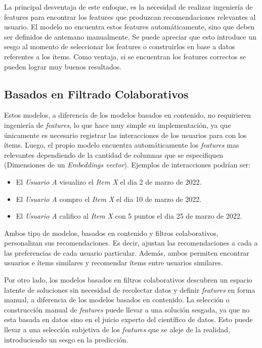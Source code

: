 \documentclass[11pt,a4paper,twoside]{thesis}
\begin{document}
La principal desventaja de este enfoque, es la necesidad de realizar ingeniería
de features para encontrar los features que produzcan recomendaciones
relevantes al usuario. El modelo no encuentra estos features automáticamente,
sino que deben ser definidos de antemano manualmente. Se puede apreciar que
esto introduce un sesgo al momento de seleccionar los features o construirlos
en base a datos referentes a los ítems. Como ventaja, si se encuentran los
features correctos se pueden lograr muy buenos resultados.

\subsection{Basados en Filtrado Colaborativos}

Estos modelos, a diferencia de los modelos basados en contenido, no requirieren
ingeniería de \textit{features}, lo que hace muy simple su implementación, ya
que únicamente es necesario registrar las interacciones de los usuarios para
con los ítems. Luego, el propio modelo encuentra automáticamente los
\textit{features} mas relevantes dependiendo de la cantidad de columnas que se
especifiquen (Dimensiones de un \textit{Embeddings vector}). Ejemplos de
interacciones podrían ser:

\begin{itemize}
	\item El \textit{Usuario A} visualizo el \textit{Item X} el dia 2 de marzo de 2022.
	\item El \textit{Usuario A} compro el \textit{Item X} el dia 10 de marzo de 2022.
	\item El \textit{Usuario A} califico al \textit{Item X} con 5 puntos el dia 25 de
	      marzo de 2022.
\end{itemize}

Ambos tipo de modelos, basados en contenido y filtros colaborativos,
personalizan sus recomendaciones. Es decir, ajustan las recomendaciones a cada
a las preferencias de cada usuario particular. Además, ambos permiten encontrar
usuarios e ítems similares y recomendar ítems entre usuarios similares.

Por otro lado, los modelos basados en filtros colaborativos descubren un
espacio latente de soluciones sin necesidad de recolectar datos y definir
\textit{features} en forma manual, a diferencia de los modelos basados en
contenido. La selección o construcción manual de \textit{features} puede llevar
a una solución sesgada, ya que no esta basada en datos sino en el juicio
experto del científico de datos. Esto puede llevar a una selección subjetiva de
los \textit{features} que se aleje de la realidad, introduciendo un sesgo en la
predicción.
\end{document}
